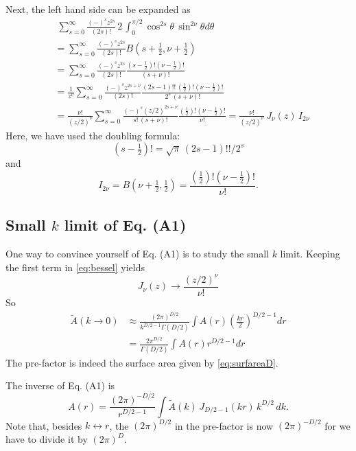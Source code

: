 \documentclass[preprint]{revtex4-1}
\numberwithin{equation}{subsection}
\numberwithin{table}{section}
\begin{document}
Next, the left hand side can be expanded as
%
\begin{align*}
& \;
  \sum_{s = 0}^\infty
  \frac{ (-)^s z^{2s} } { (2s)! }
  \,
  2 \, \int_0^{\pi/2} \cos^{2s} \theta \, \sin^{2\nu} \theta d \theta
  \\
&=
  \sum_{s = 0}^\infty
  \frac{ (-)^s z^{2s} } { (2s)! }
  B(s+\tfrac 1 2, \nu + \tfrac 1 2)
  \\
&=
  \sum_{s = 0}^\infty
  \frac{ (-)^s z^{2s} } { (2s)! }
  \frac{ (s-\tfrac 1 2)! (\nu - \tfrac 1 2)! }
       {  (s + \nu)!    }
  \\
&=
  \frac{1}{z^\nu}
  \sum_{s = 0}^\infty
  \frac{ (-)^s z^{2s + \nu} } { (2s)! }
  \frac{ (2s-1)!! \, (\tfrac 1 2)! (\nu - \tfrac 1 2)! }
      { 2^s \, (s + \nu)!    }
\\
&=
  \frac{\nu!}{(z/2)^\nu}
  \sum_{s = 0}^\infty
  \frac{ (-)^s (z/2)^{2s + \nu} } { s! \, (s + \nu)! }
  \frac{ (\tfrac 1 2)! (\nu - \tfrac 1 2)! }
       { \nu!    }
=
\frac{\nu!}{(z/2)^\nu} \, J_\nu(z) \, I_{2\nu}
\end{align*}
Here, we have used the doubling formula:
\begin{equation}
  (s - \tfrac 1 2)! = \sqrt\pi \, (2 s - 1)!! / 2^s
\end{equation}
and
\[
  I_{2\nu}
=
B(\nu + \tfrac{1}{2}, \tfrac{1}{2})
=
\frac{ (\tfrac 1 2)! (\nu - \tfrac 1 2)! }
       { \nu!    }.
\]



\subsection{Small $k$ limit of Eq. (A1)}



One way to convince yourself of Eq. (A1) is to study the small $k$ limit.
%
Keeping the first term in \eqref{eq:bessel} yields
\[
  J_\nu(z) \rightarrow \frac{ (z/2)^\nu }{ \nu! }
\]
So
%
\begin{align*}
\tilde A(k \rightarrow 0)
&\approx
\frac{ (2 \pi)^{D/2} } { k^{D/2 - 1} \Gamma(D/2) }
\int A(r) \left( \frac{k r}{2} \right)^{D/2 - 1} dr \\
&=
\frac{ 2 \pi^{D/2} } { \Gamma(D/2) }
\int A(r) r^{D/2 - 1} dr
\end{align*}
%
The pre-factor is indeed the surface area
given by \eqref{eq:surfareaD}.


The inverse of Eq. (A1) is
\begin{equation}
A(r)
=
\frac{ (2\pi)^{-D/2} } { r^{D/2 - 1} }
\int \tilde{A}(k) \, J_{D/2-1}(kr) \, k^{D/2} \, dk.
\label{eq:invftsphr}
\end{equation}
Note that, besides $k \leftrightarrow r$,
the $(2\pi)^{D/2}$ in the pre-factor is now $(2\pi)^{-D/2}$
for we have to divide it by $(2\pi)^D$.
\end{document}

